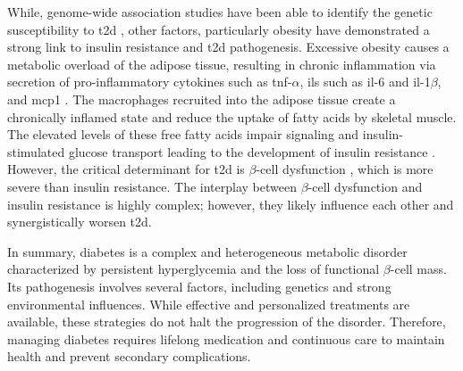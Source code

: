 While, genome-wide association studies have been able to identify the genetic susceptibility to \gls{t2d} \textbf{\cite{grarup_genetic_2014, wang_genetic_2016}}, other factors, particularly obesity have demonstrated a strong link to insulin resistance and \gls{t2d} pathogenesis. Excessive obesity causes a metabolic overload of the adipose tissue, resulting in chronic inflammation via secretion of pro-inflammatory cytokines such as \gls{tnf}-$\alpha$, \glspl{il} such as \gls{il}-6 and \gls{il}-1$\beta$, and \gls{mcp1} \textbf{\cite{guilherme_adipocyte_2008}}. The macrophages recruited into the adipose tissue create a chronically inflamed state and reduce the uptake of fatty acids by skeletal muscle. The elevated levels of these free fatty acids impair signaling and insulin-stimulated glucose transport leading to the development of insulin resistance \textbf{\cite{unger_lipotoxicity_1995,uysal_protection_1997,kanda_mcp-1_2006}}. However, the critical determinant for \gls{t2d} is $\beta$-cell dysfunction \textbf{\cite{tahrani_glycaemic_2010, khin_pancreatic_2023}}, which is more severe than insulin resistance. The interplay between $\beta$-cell dysfunction and insulin resistance is highly complex; however, they likely influence each other and synergistically worsen \gls{t2d}.\\

\par In summary, diabetes is a complex and heterogeneous metabolic disorder characterized by persistent hyperglycemia and the loss of functional $\beta$-cell mass. Its pathogenesis involves several factors, including genetics and strong environmental influences. While effective and personalized treatments are available, these strategies do not halt the progression of the disorder. Therefore, managing diabetes requires lifelong medication and continuous care to maintain health and prevent secondary complications.



